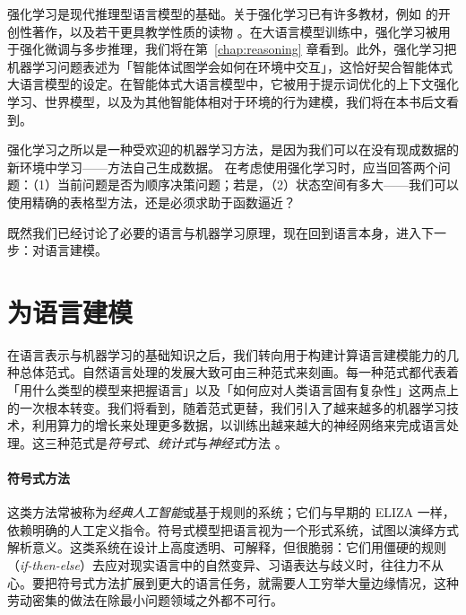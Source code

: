 强化学习是现代推理型语言模型的基础。关于强化学习已有许多教材，例如 \citet{sutton2018reinforcement} 的开创性著作，以及若干更具教学性质的读物 \citep{graesser2019foundations,plaat2020learning,plaat2022deep}。在大语言模型训练中，强化学习被用于强化微调与多步推理，我们将在第~\ref{chap:reasoning} 章看到。此外，强化学习把机器学习问题表述为「智能体试图学会如何在环境中交互」，这恰好契合智能体式大语言模型的设定。在智能体式大语言模型中，它被用于提示词优化的上下文强化学习、世界模型，以及为其他智能体相对于环境的行为建模，我们将在本书后文看到。


强化学习之所以是一种受欢迎的机器学习方法，是因为我们可以在没有现成数据的新环境中学习——方法自己生成数据。 %
在考虑使用强化学习时，应当回答两个问题：（1）当前问题是否为顺序决策问题；若是，（2）状态空间有多大——我们可以使用精确的表格型方法，还是必须求助于函数逼近？



既然我们已经讨论了必要的语言与机器学习原理，现在回到语言本身，进入下一步：对语言建模。  

\section{为语言建模}\label{sec:modernNLP}
在语言表示与机器学习的基础知识之后，我们转向用于构建计算语言建模能力的几种总体范式。自然语言处理的发展大致可由三种范式来刻画。每一种范式都代表着「用什么类型的模型来把握语言」以及「如何应对人类语言固有复杂性」这两点上的一次根本转变。我们将看到，随着范式更替，我们引入了越来越多的机器学习技术，利用算力的增长来处理更多数据，以训练出越来越大的神经网络来完成语言处理。这三种范式是\textit{符号式}、\textit{统计式}与\textit{神经式}方法 \citep{kautz2020third, deng2018deep}。

\paragraph{符号式方法} 这类方法常被称为\textit{经典人工智能}或基于规则的系统；它们与早期的 ELIZA 一样，依赖明确的人工定义指令。符号式模型把语言视为一个形式系统，试图以演绎方式解析意义。这类系统在设计上高度透明、可解释，但很脆弱：它们用僵硬的规则（\textit{if-then-else}）去应对现实语言中的自然变异、习语表达与歧义时，往往力不从心。要把符号式方法扩展到更大的语言任务，就需要人工穷举大量边缘情况，这种劳动密集的做法在除最小问题领域之外都不可行。

